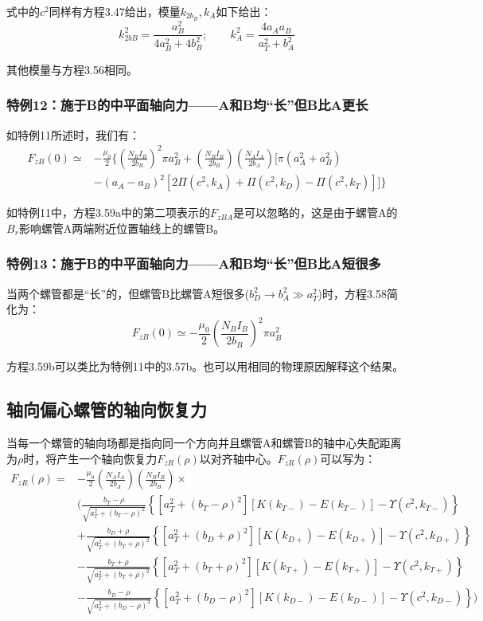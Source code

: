 式中的$c^2$同样有方程3.47给出，模量$k_{2b_B},k_A$如下给出：
\begin{equation*}
k_{2bB}^2=\frac{a_B^2}{4a_B^2+4b_B^2};\quad \quad k_A^2=\frac{4a_Aa_B}{a_T^2+b_A^2}
\end{equation*}

其他模量与方程3.56相同。

\subsubsection{特例12：施于B的中平面轴向力——A和B均“长”但B比A更长}
如特例11所述时，我们有：
\begin{equation}
\begin{split}
F_{zB}(0)\simeq&-\frac{\mu_0}{2}\big\{(\frac{N_BI_B}{2b_B})^2\pi a_B^2+(\frac {N_BI_B}{2b_B})(\frac{N_AI_A}{2b_A})[\pi(a_A^2+a_B^2)\\
&-(a_A-a_B)^2[2\Pi(c^2,k_A)+\Pi(c^2,k_D)-\Pi(c^2,k_T)]]\big\}
\end{split}
\end{equation}

如特例11中，方程3.59a中的第二项表示的$F_{zBA}$是可以忽略的，这是由于螺管A的$B_r$影响螺管A两端附近位置轴线上的螺管B。

\subsubsection{特例13：施于B的中平面轴向力——A和B均“长”但B比A短很多}
当两个螺管都是“长”的，但螺管B比螺管A短很多($b_D^2\rightarrow b_A^2\gg a_T^2$)时，方程3.58简化为：
\begin{equation*}
F_{zB}(0)\simeq-\frac{\mu_0}{2}\left(\frac{N_BI_B}{2b_B}\right)^2\pi a_B^2 \tag{3.59'}
\end{equation*}

方程3.59b可以类比为特例11中的3.57b。也可以用相同的物理原因解释这个结果。

\subsection{轴向偏心螺管的轴向恢复力}
当每一个螺管的轴向场都是指向同一个方向并且螺管A和螺管B的轴中心失配距离为$\rho$时，将产生一个轴向恢复力$F_{zR}(\rho)$以对齐轴中心。$F_{zR}(\rho)$可以写为：
\begin{equation}
\begin{split}
F_{zR}(\rho)=&-\frac{\mu_0}{2}(\frac{N_AI_A}{2b_A})(\frac{N_BI_B}{2b_B})\times\\
&(\frac{b_T-\rho}{\sqrt{a_T^2+(b_T-\rho)^2}}\left\{[a_T^2+(b_T-\rho)^2][K(k_{T-})-E(k_{T-})]-\Upsilon(c^2,k_{T-})\right\}\\
&+\frac{b_D+\rho}{\sqrt{a_T^2+(b_T+\rho)^2}}\left\{[a_T^2+(b_D+\rho)^2][K(k_{D+})-E(k_{D+})]-\Upsilon(c^2,k_{D+})\right\}\\
&-\frac{b_T+\rho}{\sqrt{a_T^2+(b_T+\rho)^2}}\left\{[a_T^2+(b_T+\rho)^2][K(k_{T+})-E(k_{T+})]-\Upsilon(c^2,k_{T+})\right\}\\
&-\frac{b_D-\rho}{\sqrt{a_T^2+(b_D-\rho)^2}}\left\{[a_T^2+(b_D-\rho)^2][K(k_{D-})-E(k_{D-})]-\Upsilon(c^2,k_{D-})\right\})
\end{split}
\end{equation}

